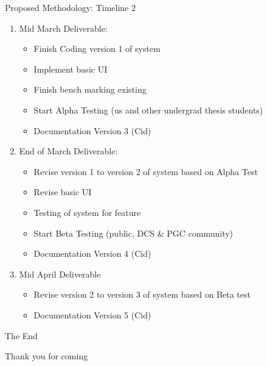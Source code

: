 \documentclass{beamer}
\begin{document}
    \begin{frame}{Proposed Methodology: Timeline 2}
        \begin{enumerate}  
        \item Mid March Deliverable:
            \begin{itemize}
                \item Finish Coding version 1 of system
                \item Implement basic UI
                \item Finish bench marking existing 
                \item Start Alpha Testing (us and other undergrad thesis students)
                \item Documentation Version 3 (Cid)
            \end{itemize}
        \item End of March Deliverable:
            \begin{itemize}
                \item Revise version 1 to version 2 of system based on Alpha Test
                \item Revise basic UI
                \item Testing of system for feature 
                \item Start Beta Testing (public, DCS \& PGC community)
                \item Documentation Version 4 (Cid)
            \end{itemize}
        \item Mid April Deliverable
            \begin{itemize}
                \item Revise version 2 to version 3 of system based on Beta test
                \item Documentation Version 5 (Cid)
            \end{itemize}
    \end{enumerate}
\end{frame}

\begin{frame}
\Huge{\centerline{The End}}
\small{\centerline{Thank you for coming}}
\end{frame}
\end{document}
